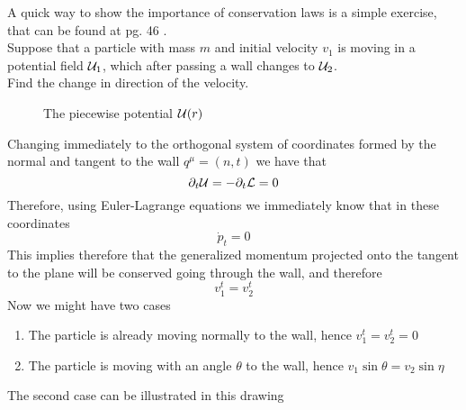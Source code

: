 \documentclass[../admech.tex]{subfiles}
\begin{document}
\begin{exe}
	A quick way to show the importance of conservation laws is a simple exercise, that can be found at pg. 46 \cite{landau1}.\\
	Suppose that a particle with mass $m$ and initial velocity $v_1$ is moving in a potential field $\pot_1$, which after passing a wall changes to $\pot_2$.\\
	Find the change in direction of the velocity.
	\begin{figure}[H]
		\centering
		\caption{The piecewise potential $\pot(r)$}
		\label{fig:piecpot}
	\end{figure}
	Changing immediately to the orthogonal system of coordinates formed by the normal and tangent  to the wall $q^\mu=(n,t)$ we have that
	\begin{equation*}
		\del_t\pot=-\del_t\lag=0
	\end{equation*}
	Therefore, using Euler-Lagrange equations we immediately know that in these coordinates
	\begin{equation*}
		\dot{p}_t=0
	\end{equation*}
	This implies therefore that the generalized momentum projected onto the tangent to the plane will be conserved going through the wall, and therefore
	\begin{equation*}
		v_1^t=v_2^t
	\end{equation*}
	Now we might have two cases
	\begin{enumerate}
	\item The particle is already moving normally to the wall, hence $v_1^t=v_2^t=0$
	\item The particle is moving with an angle $\theta$ to the wall, hence $v_1\sin\theta=v_2\sin\eta$
	\end{enumerate}
	The second case can be illustrated in this drawing\\
	\begin{minipage}[c]{0.5\textwidth}
		\begin{figure}[H]
			\centering
			\begin{tikzpicture}

\end{tikzpicture}
\end{figure}
\end{minipage}
\end{exe}
\end{document}
